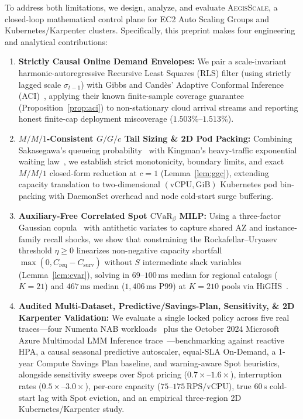 \documentclass[journal]{IEEEtran}
\begin{document}
To address both limitations, we design, analyze, and evaluate \textsc{AegisScale}, a closed-loop mathematical control plane for EC2 Auto Scaling Groups and Kubernetes/Karpenter clusters. Specifically, this preprint makes four engineering and analytical contributions:
\begin{enumerate}
    \item \textbf{Strictly Causal Online Demand Envelopes:} We pair a scale-invariant harmonic-autoregressive Recursive Least Squares (RLS) filter (using strictly lagged scale $\sigma_{t-1}$) with Gibbs and Cand\`es' Adaptive Conformal Inference (ACI)~\cite{gibbs2021adaptive,angelopoulos2023conformal}, applying their known finite-sample coverage guarantee (Proposition~\ref{prop:aci}) to non-stationary cloud arrival streams and reporting honest finite-cap deployment miscoverage ($1.503\%$--$1.513\%$).
    \item \textbf{$M/M/1$-Consistent $G/G/c$ Tail Sizing \& 2D Pod Packing:} Combining Sakasegawa's queueing probability~\cite{sakasegawa1977approximation} with Kingman's heavy-traffic exponential waiting law~\cite{kingman1961single,whitt1993approximations}, we establish strict monotonicity, boundary limits, and exact $M/M/1$ closed-form reduction at $c=1$ (Lemma~\ref{lem:ggc}), extending capacity translation to two-dimensional $(\text{vCPU}, \text{GiB})$ Kubernetes pod bin-packing with DaemonSet overhead and node cold-start surge buffering.
    \item \textbf{Auxiliary-Free Correlated Spot $\mathrm{CVaR}_\beta$ MILP:} Using a three-factor Gaussian copula~\cite{li2000default} with antithetic variates to capture shared AZ and instance-family recall shocks, we show that constraining the Rockafellar--Uryasev threshold $\eta \ge 0$ linearizes non-negative capacity shortfall $\max(0, C_{\mathrm{req}} - C_{\mathrm{surv}})$ without $S$ intermediate slack variables (Lemma~\ref{lem:cvar}), solving in $69$--$100\,\mathrm{ms}$ median for regional catalogs ($K=21$) and $467\,\mathrm{ms}$ median ($1,406\,\mathrm{ms}$ P99) at $K=210$ pools via HiGHS~\cite{huangfu2018parallelizing}.
    \item \textbf{Audited Multi-Dataset, Predictive/Savings-Plan, Sensitivity, \& 2D Karpenter Validation:} We evaluate a single locked policy across five real traces---four Numenta NAB workloads~\cite{lavin2015evaluating} plus the October 2024 Microsoft Azure Multimodal LMM Inference trace~\cite{qiu2025modserve}---benchmarking against reactive HPA, a causal seasonal predictive autoscaler, equal-SLA On-Demand, a 1-year Compute Savings Plan baseline, and warning-aware Spot heuristics, alongside sensitivity sweeps over Spot pricing ($0.7\times$--$1.6\times$), interruption rates ($0.5\times$--$3.0\times$), per-core capacity ($75$--$175\,\text{RPS/vCPU}$), true $60\,\mathrm{s}$ cold-start lag with Spot eviction, and an empirical three-region 2D Kubernetes/Karpenter study.
\end{enumerate}
\end{document}
